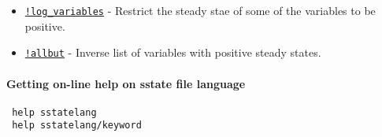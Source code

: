  \begin{itemize}
 \item
   \href{sstatelang/logvariables}{\texttt{!log\_variables}} - Restrict
   the steady stae of some of the variables to be positive.
 \item
   \href{sstatelang/allbut}{\texttt{!allbut}} - Inverse list of variables
   with positive steady states.
 \end{itemize}
 
 \paragraph{Getting on-line help on sstate file language}
 
 \begin{verbatim}
 help sstatelang
 help sstatelang/keyword
 \end{verbatim}



